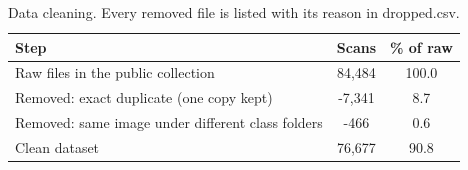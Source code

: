 \begin{table}[t]
\centering
\small
\caption{Data cleaning. Every removed file is listed with its reason in dropped.csv.}
\label{tab:cleaning}
\begin{tabular}{lcc}
\toprule
Step & Scans & \% of raw \\
\midrule
Raw files in the public collection & 84,484 & 100.0 \\
Removed: exact duplicate (one copy kept) & -7,341 & 8.7 \\
Removed: same image under different class folders & -466 & 0.6 \\
Clean dataset & 76,677 & 90.8 \\
\bottomrule
\end{tabular}
\end{table}
